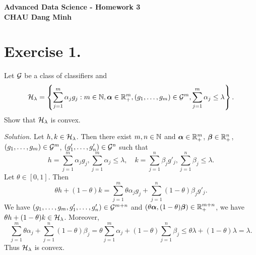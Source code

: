 \begin{center}
  \bf
  \vspace{0.9cm}
  Advanced Data Science - Homework 3\\
  \vspace{0.2cm}
  CHAU Dang Minh
\end{center}

\section{Exercise 1.} Let $\mathcal{G}$ be a class of classifiers and
$$\mathcal{H}_\lambda = \left\{\sum_{j=1}^m \alpha_jg_j : m\in{\mathbb{N}}, \bm{\alpha} \in {\mathbb{R}}^m_+, (g_1,\ldots,g_m) \in \mathcal{G}^m, \sum_{j=1}^m \alpha_j \le \lambda \right\}.$$
Show that $\mathcal{H}_\lambda$ is convex.

\textit{Solution.} Let $h,k\in \mathcal{H}_\lambda$. Then there exist $m,n\in{\mathbb{N}}$ and $\bm{\alpha}\in{\mathbb{R}}^m_+$, $\bm{\beta}\in{\mathbb{R}}^n_+$, $(g_1,\ldots,g_m)\in\mathcal{G}^m$, $(g'_1,\ldots,g'_n)\in\mathcal{G}^n$ such that
$$h = \sum_{j=1}^m \alpha_j g_j, \sum_{j=1}^m \alpha_j \le \lambda, \quad k = \sum_{j=1}^n \beta_j g'_j, \sum_{j=1}^n \beta_j \le \lambda.$$
Let $\theta\in[0,1]$. Then
$$\theta h + (1-\theta)k = \sum_{j=1}^m \theta \alpha_j g_j + \sum_{j=1}^n (1-\theta)\beta_j g'_j.$$
We have $(g_1,\ldots,g_m,g'_1,\ldots,g'_n)\in\mathcal{G}^{m+n}$ and $(\theta \bm{\alpha}, (1-\theta)\bm{\beta})\in{\mathbb{R}}^{m+n}_+$, we have $\theta h + (1-\theta)k \in \mathcal{H}_\lambda$. Moreover,
$$\sum_{j=1}^m \theta \alpha_j + \sum_{j=1}^n (1-\theta)\beta_j = \theta \sum_{j=1}^m \alpha_j + (1-\theta) \sum_{j=1}^n \beta_j \le \theta \lambda + (1-\theta)\lambda = \lambda.$$
Thus $\mathcal{H}_\lambda$ is convex.